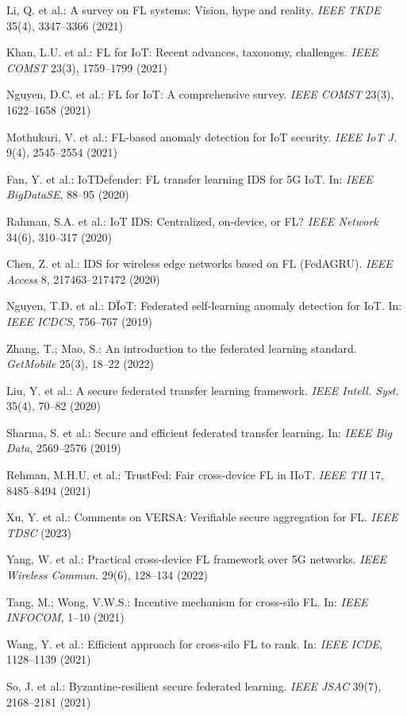 \documentclass[a4paper]{article}
\begin{document}
\begin{enumerate}[leftmargin=0.8cm, itemsep=0pt, parsep=0pt, label={[\arabic*]}]
\item Li, Q. et al.: A survey on FL systems: Vision, hype and reality. \textit{IEEE TKDE} 35(4), 3347--3366 (2021)
\item Khan, L.U. et al.: FL for IoT: Recent advances, taxonomy, challenges. \textit{IEEE COMST} 23(3), 1759--1799 (2021)
\item Nguyen, D.C. et al.: FL for IoT: A comprehensive survey. \textit{IEEE COMST} 23(3), 1622--1658 (2021)
\item Mothukuri, V. et al.: FL-based anomaly detection for IoT security. \textit{IEEE IoT J.} 9(4), 2545--2554 (2021)
\item Fan, Y. et al.: IoTDefender: FL transfer learning IDS for 5G IoT. In: \textit{IEEE BigDataSE}, 88--95 (2020)
\item Rahman, S.A. et al.: IoT IDS: Centralized, on-device, or FL? \textit{IEEE Network} 34(6), 310--317 (2020)
\item Chen, Z. et al.: IDS for wireless edge networks based on FL (FedAGRU). \textit{IEEE Access} 8, 217463--217472 (2020)
\item Nguyen, T.D. et al.: D\"IoT: Federated self-learning anomaly detection for IoT. In: \textit{IEEE ICDCS}, 756--767 (2019)
\item Zhang, T.; Mao, S.: An introduction to the federated learning standard. \textit{GetMobile} 25(3), 18--22 (2022)
\item Liu, Y. et al.: A secure federated transfer learning framework. \textit{IEEE Intell. Syst.} 35(4), 70--82 (2020)
\item Sharma, S. et al.: Secure and efficient federated transfer learning. In: \textit{IEEE Big Data}, 2569--2576 (2019)
\item Rehman, M.H.U. et al.: TrustFed: Fair cross-device FL in IIoT. \textit{IEEE TII} 17, 8485--8494 (2021)
\item Xu, Y. et al.: Comments on VERSA: Verifiable secure aggregation for FL. \textit{IEEE TDSC} (2023)
\item Yang, W. et al.: Practical cross-device FL framework over 5G networks. \textit{IEEE Wireless Commun.} 29(6), 128--134 (2022)
\item Tang, M.; Wong, V.W.S.: Incentive mechanism for cross-silo FL. In: \textit{IEEE INFOCOM}, 1--10 (2021)
\item Wang, Y. et al.: Efficient approach for cross-silo FL to rank. In: \textit{IEEE ICDE}, 1128--1139 (2021)
\item So, J. et al.: Byzantine-resilient secure federated learning. \textit{IEEE JSAC} 39(7), 2168--2181 (2021)

\end{enumerate}
\end{document}
